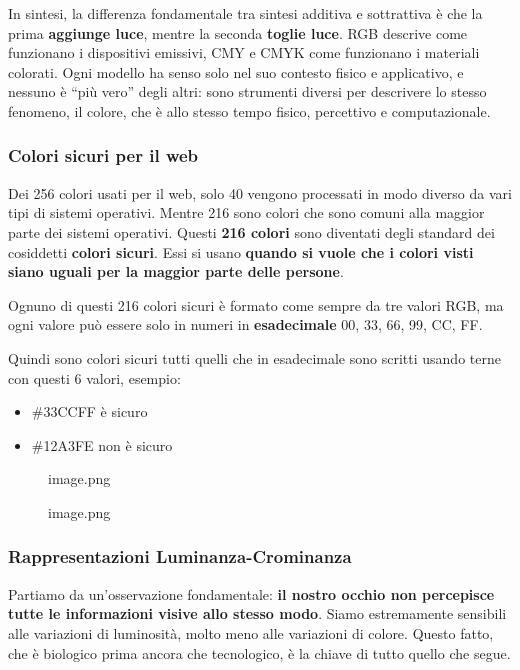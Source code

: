 \documentclass[
]{article}
\providecommand{\tightlist}{%
  \setlength{\itemsep}{0pt}\setlength{\parskip}{0pt}}
\begin{document}
In sintesi, la differenza fondamentale tra sintesi additiva e sottrattiva è che la prima \textbf{aggiunge luce}, mentre la seconda \textbf{toglie luce}. RGB descrive come funzionano i dispositivi emissivi, CMY e CMYK come funzionano i materiali colorati. Ogni modello ha senso solo nel suo contesto fisico e applicativo, e nessuno è ``più vero'' degli altri: sono strumenti diversi per descrivere lo stesso fenomeno, il colore, che è allo stesso tempo fisico, percettivo e computazionale.

\hypertarget{colori-sicuri-per-il-web}{%
\subsubsection{Colori sicuri per il web}\label{colori-sicuri-per-il-web}}

Dei 256 colori usati per il web, solo 40 vengono processati in modo diverso da vari tipi di sistemi operativi. Mentre 216 sono colori che sono comuni alla maggior parte dei sistemi operativi. Questi \textbf{216 colori} sono diventati degli standard dei cosiddetti \textbf{colori sicuri}. Essi si usano \textbf{quando si vuole che i colori visti siano uguali per la maggior parte delle persone}.

Ognuno di questi 216 colori sicuri è formato come sempre da tre valori RGB, ma ogni valore può essere solo in numeri in \textbf{esadecimale} 00, 33, 66, 99, CC, FF.

Quindi sono colori sicuri tutti quelli che in esadecimale sono scritti usando terne con questi 6 valori, esempio:

\begin{itemize}
\tightlist
\item
  \#33CCFF è sicuro
\item
  \#12A3FE non è sicuro
\end{itemize}

\begin{figure}
\centering
{image.png}
\caption{image.png}
\end{figure}

\hypertarget{rappresentazioni-luminanza-crominanza}{%
\subsubsection{Rappresentazioni Luminanza-Crominanza}\label{rappresentazioni-luminanza-crominanza}}

Partiamo da un'osservazione fondamentale: \textbf{il nostro occhio non percepisce tutte le informazioni visive allo stesso modo}. Siamo estremamente sensibili alle variazioni di luminosità, molto meno alle variazioni di colore. Questo fatto, che è biologico prima ancora che tecnologico, è la chiave di tutto quello che segue.
\end{document}
